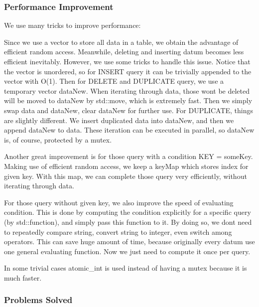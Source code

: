 \subsubsection*{Performance Improvement}

We use many tricks to improve performance\+:
\begin{DoxyItemize}
\item Since we use a vector to store all data in a table, we obtain the advantage of efficient random access. Meanwhile, deleting and inserting datum becomes less efficient inevitably. However, we use some tricks to handle this issue. Notice that the vector is unordered, so for I\+N\+S\+E\+RT query it can be trivially appended to the vector with O(1). Then for D\+E\+L\+E\+TE and D\+U\+P\+L\+I\+C\+A\+TE query, we use a temporary vector {\ttfamily data\+New}. When iterating through data, those won\textquotesingle{}t be deleted will be moved to data\+New by {\ttfamily std\+::move}, which is extremely fast. Then we simply swap {\ttfamily data} and {\ttfamily data\+New}, clear {\ttfamily data\+New} for further use. For D\+U\+P\+L\+I\+C\+A\+TE, things are slightly different. We insert duplicated data into {\ttfamily data\+New}, and then we append {\ttfamily data\+New} to {\ttfamily data}. These iteration can be executed in parallel, so {\ttfamily data\+New} is, of course, protected by a mutex.
\item Another great improvement is for those query with a condition \textquotesingle{}K\+EY = some\+Key\textquotesingle{}. Making use of efficient random access, we keep a {\ttfamily key\+Map} which stores index for given key. With this map, we can complete those query very efficiently, without iterating through data.
\item For those query without given key, we also improve the speed of evaluating condition. This is done by computing the condition explicitly for a specific query (by {\ttfamily std\+::function}), and simply pass this function to it. By doing so, we don\textquotesingle{}t need to repeatedly compare string, convert string to integer, even switch among operators. This can save huge amount of time, because originally every datum use one general evaluating function. Now we just need to compute it once per query.
\item In some trivial cases atomic\+\_\+int is used instead of having a mutex because it is much faster.
\end{DoxyItemize}

\subsubsection*{Problems Solved}

